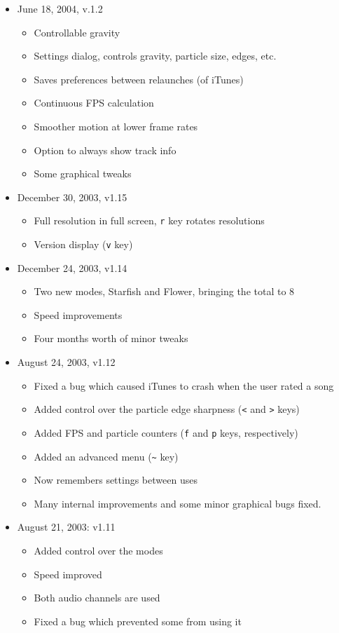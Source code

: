 \documentclass[11pt]{article}
\begin{document}
\begin{itemize}
\item June 18, 2004, v.1.2
\begin{itemize}
\item Controllable gravity
\item Settings dialog, controls gravity, particle size, edges, etc.
\item Saves preferences between relaunches (of iTunes)
\item Continuous FPS calculation
\item Smoother motion at lower frame rates
\item Option to always show track info
\item Some graphical tweaks
\end{itemize}

\item December 30, 2003, v1.15
\begin{itemize}
\item Full resolution in full screen, \verb|r| key rotates resolutions
\item Version display (\verb'v' key)
\end{itemize}

\item December 24, 2003, v1.14
\begin{itemize}
\item Two new modes, Starfish and Flower, bringing the total to 8
\item Speed improvements
\item Four months worth of minor tweaks
\end{itemize}

\item August 24, 2003, v1.12
\begin{itemize}
\item Fixed a bug which caused iTunes to crash when the user rated a song
\item Added control over the particle edge sharpness (\verb'<' and \verb'>' keys)
\item Added FPS and particle counters (\verb'f' and \verb'p' keys, respectively)
\item Added an advanced menu (\verb'~' key)
\item Now remembers settings between uses
\item Many internal improvements and some minor graphical bugs fixed.
\end{itemize}

\item August 21, 2003: v1.11
\begin{itemize}
\item Added control over the modes
\item Speed improved
\item Both audio channels are used
\item Fixed a bug which prevented some from using it
\end{itemize}


\end{itemize}
\end{document}
